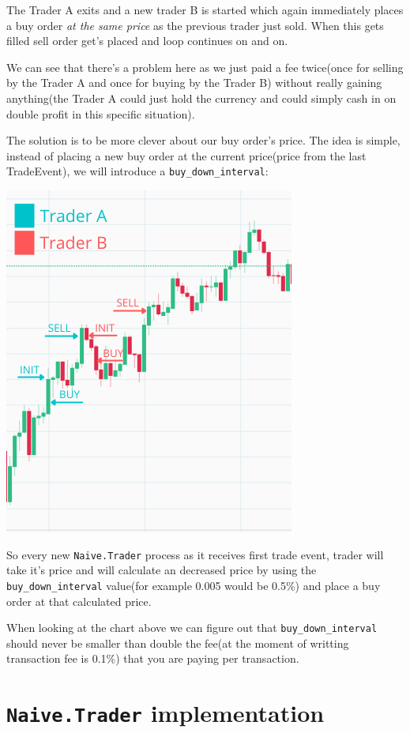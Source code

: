\documentclass[
  oneside]{book}
\begin{document}
The Trader A exits and a new trader B is started which again immediately places a buy order \emph{at the same price} as the previous trader just sold. When this gets filled sell order get's placed and loop continues on and on.

We can see that there's a problem here as we just paid a fee twice(once for selling by the Trader A and once for buying by the Trader B) without really gaining anything(the Trader A could just hold the currency and could simply cash in on double profit in this specific situation).

The solution is to be more clever about our buy order's price. The idea is simple, instead of placing a new buy order at the current price(price from the last TradeEvent), we will introduce a \texttt{buy\_down\_interval}:

\includegraphics{images/chapter_06_02_rebuy_expl.png}

So every new \texttt{Naive.Trader} process as it receives first trade event, trader will take it's price and will calculate an decreased price by using the \texttt{buy\_down\_interval} value(for example 0.005 would be 0.5\%) and place a buy order at that calculated price.

When looking at the chart above we can figure out that \texttt{buy\_down\_interval} should never be smaller than double the fee(at the moment of writting transaction fee is 0.1\%) that you are paying per transaction.

\hypertarget{naive.trader-implementation}{%
\section{\texorpdfstring{\texttt{Naive.Trader} implementation}{Naive.Trader implementation}}\label{naive.trader-implementation}}
\end{document}
